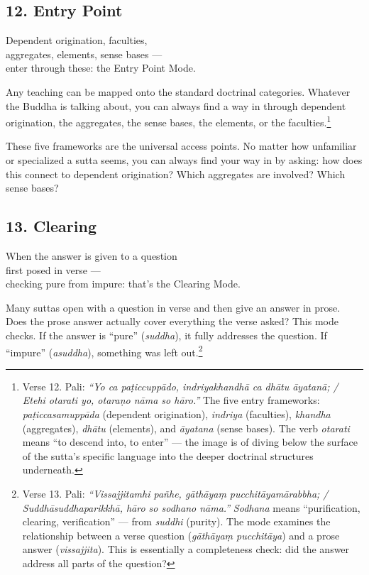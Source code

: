 \subsection*{12. Entry Point}

\begin{versebox}
Dependent origination, faculties,\\
aggregates, elements, sense bases ---\\
enter through these: the Entry Point Mode.
\end{versebox}

Any teaching can be mapped onto the standard doctrinal categories. Whatever the Buddha is talking about, you can always find a way in through dependent origination, the aggregates, the sense bases, the elements, or the faculties.\footnote{Verse 12. Pali: \textit{``Yo ca paṭiccuppādo, indriyakhandhā ca dhātu āyatanā; / Etehi otarati yo, otaraṇo nāma so hāro.''} The five entry frameworks: \textit{paṭiccasamuppāda} (dependent origination), \textit{indriya} (faculties), \textit{khandha} (aggregates), \textit{dhātu} (elements), and \textit{āyatana} (sense bases). The verb \textit{otarati} means ``to descend into, to enter'' --- the image is of diving below the surface of the sutta's specific language into the deeper doctrinal structures underneath.}

These five frameworks are the universal access points. No matter how unfamiliar or specialized a sutta seems, you can always find your way in by asking: how does this connect to dependent origination? Which aggregates are involved? Which sense bases?

\subsection*{13. Clearing}

\begin{versebox}
When the answer is given to a question\\
first posed in verse ---\\
checking pure from impure: that's the Clearing Mode.
\end{versebox}

Many suttas open with a question in verse and then give an answer in prose. Does the prose answer actually cover everything the verse asked? This mode checks. If the answer is ``pure'' (\textit{suddha}), it fully addresses the question. If ``impure'' (\textit{asuddha}), something was left out.\footnote{Verse 13. Pali: \textit{``Vissajjitamhi pañhe, gāthāyaṃ pucchitāyamārabbha; / Suddhāsuddhaparikkhā, hāro so sodhano nāma.''} \textit{Sodhana} means ``purification, clearing, verification'' --- from \textit{suddhi} (purity). The mode examines the relationship between a verse question (\textit{gāthāyaṃ pucchitāya}) and a prose answer (\textit{vissajjita}). This is essentially a completeness check: did the answer address all parts of the question?}

